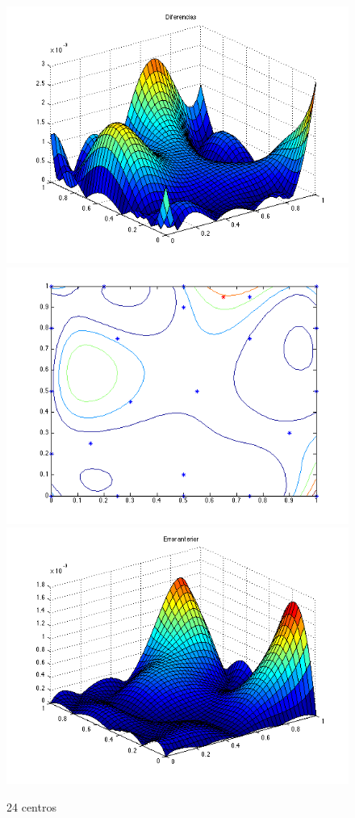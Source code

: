 \documentclass[11pt,a4paper]{article}
\begin{document}
\begin{figure}[H]
\centering

\includegraphics[scale=0.35]{diferencias24.png}
\includegraphics[scale=0.35]{centros24.png}
\includegraphics[scale=0.35]{error24.png}
\caption{24 centros}
\end{figure}
\end{document}

